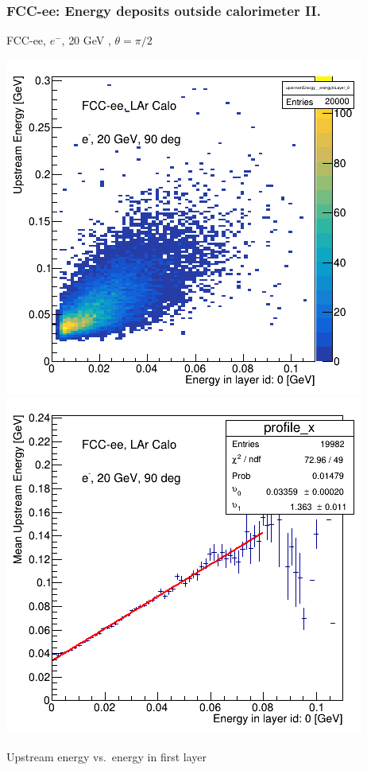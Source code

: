 \documentclass[aspectratio=169]{beamer}
\newcommand{\redtext}[1]{%
  \textcolor{myRed}{#1}
}
\begin{document}
\begin{frame}
  \frametitle{FCC-ee: Energy deposits outside calorimeter II.}

  \centering
  FCC-ee, $e^{-}$, \redtext{20 GeV}, $\theta = \pi/2$ \\[1.5ex]
  \begin{adjustwidth}{-9mm}{-9mm}
    \includegraphics[width=0.49\linewidth]{figures/12layers/hist_upstream_vs_layer_0_90deg_20GeV.png}
    \includegraphics[width=0.49\linewidth]{figures/12layers/profile_upstream_vs_layer_0_90deg_20GeV.png}
  \end{adjustwidth}
  \redtext{Upstream} energy vs.\ energy in first layer
\end{frame}
\end{document}
